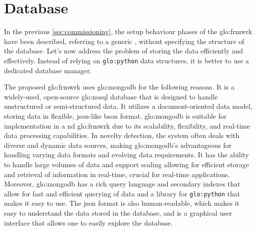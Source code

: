 
\section{Database}
\label{sec:Database}
In the previous \autoref{sec:commissioning}, the setup behaviour phases of the \gls{glo:frmwrk} have been described, referring to a generic , without specifying the structure of the database. Let's now address the problem of storing the data efficiently and effectively. Instead of relying on \texttt{\gls{glo:python}} data structures, it is better to use a dedicated database manager.

The proposed \gls{glo:frmwrk} uses \gls{glo:mongodb} for the following reasons. It is a widely-used, open-source \gls{glo:nosql} database that is designed to handle unstructured or semi-structured data. It utilizes a document-oriented data model, storing data in flexible, \gls{json}-like \gls{bson} format. \gls{glo:mongodb} is suitable for implementation in a \gls{nd} \gls{glo:frmwrk} due to its scalability, flexibility, and real-time data processing capabilities. In novelty detection, the system often deals with diverse and dynamic data sources, making \gls{glo:mongodb}'s  advantageous for handling varying data formats and evolving data requirements. It has the ability to handle large volumes of data and support scaling allowing for efficient storage and retrieval of information in real-time, crucial for real-time applications. Moreover, \gls{glo:mongodb} has a rich query language and secondary indexes that allow for fast and efficient querying of data and a library for \texttt{\gls{glo:python}} that makes it easy to use.
The \gls{json} format is also human-readable, which makes it easy to understand the data stored in the database, and  is a graphical user interface that allows one to easily explore the database.

